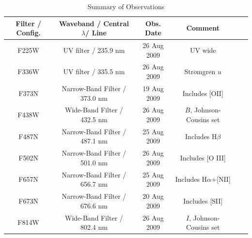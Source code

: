 \documentclass[11pt,fleqn]{book} %
\begin{document}
\begin{table}[h]
  \centering
  \begin{tabular}{ c c c c c c }
    \hline\hline
    Filter / Config. & Waveband / Central $\lambda$/ Line & Obs. Date & Comment \\
    \hline
    F225W & UV filter / 235.9 nm & 26 Aug 2009 &  UV wide\\
    
    F336W & UV filter / 335.5 nm & 26 Aug 2009 & Str$\ddot{o}$mgren $u$\\
    
    F373N & Narrow-Band Filter / 373.0 nm & 19 Aug 2009 & Includes \textsc{[OII]}\\
    
    F438W & Wide-Band Filter / 432.5 nm & 26 Aug 2009 & $B$, Johnson-Cousins set\\
    
    F487N & Narrow-Band Filter / 487.1 nm & 25 Aug 2009 & Includes H$\beta$\\
    
    F502N & Narrow-Band Filter / 501.0 nm & 26 Aug 2009 & Includes \textsc{[O III]}\\
    
    F657N & Narrow-Band Filter / 656.7 nm & 25 Aug 2009 & Includes H$\alpha$+\textsc{[NII]}\\
    
    F673N & Narrow-Band Filter / 676.6 nm & 20 Aug 2009 & Includes \textsc{[SII]}\\
    
    F814W & Wide-Band Filter / 802.4 nm & 26 Aug 2009 & $I$, Johnson-Cousins set\\
    \hline
  \end{tabular}
  \caption{Summary of Observations}
  \label{tab:uno}
\end{table}
\end{document}
